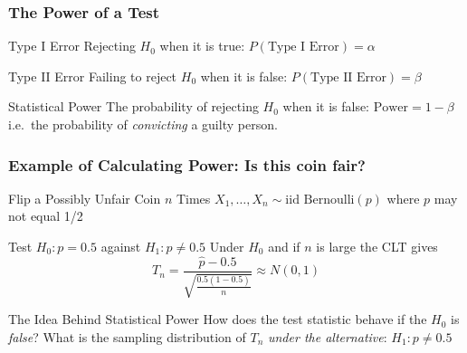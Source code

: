 \documentclass[handout]{beamer}
\begin{document}
\begin{frame}[c]\frametitle{The Power of a Test}
    
\begin{block}
	{Type I Error} Rejecting $H_0$ when it is true:  $P(\mbox{Type I Error}) = \alpha$
\end{block}

\begin{block}
	{Type II Error} Failing to reject $H_0$ when it is false: \alert{$P(\mbox{Type II Error}) =\beta$}
\end{block}

\begin{alertblock}
	{Statistical Power} The probability of rejecting $H_0$ when it is false: \alert{$\mbox{Power} = 1 -\beta $}\\ i.e.\ the probability of \emph{convicting} a guilty person.
\end{alertblock}

\vspace{1em}

\begin{center}
\alert{}
\end{center}
\end{frame}
\begin{frame}
\frametitle{Example of Calculating Power: Is this coin fair?}

\begin{block}
{Flip a Possibly Unfair Coin $n$ Times}
$X_1, \hdots, X_n \sim \mbox{iid Bernoulli}(p)$ where $p$ may not equal 1/2
\end{block}

\begin{block}
	{Test $H_0\colon p = 0.5$ against $H_1\colon p \neq 0.5$}
	Under $H_0$ and if $n$ is large the CLT gives 
	$$\displaystyle T_n = \frac{\widehat{p} - 0.5}{\sqrt{\frac{0.5(1-0.5)}{n}}}\approx N(0,1)$$
\end{block}

\begin{alertblock}
	{The Idea Behind Statistical Power}
	How does the test statistic behave if the  $H_0$ is \emph{false}? What is the sampling distribution of $T_n$ \emph{under the alternative}: $H_1\colon p\neq 0.5$
\end{alertblock}

\end{frame}
\end{document}
